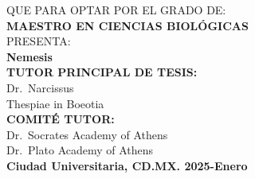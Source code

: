 \documentclass[
  10pt]{article}
\begin{document}
\begin{titlepage}
\begin{center}
        {\large QUE PARA OPTAR POR EL GRADO DE:}\\[0.15cm]
        {\Large \textbf{MAESTRO EN CIENCIAS BIOLÓGICAS}}\\[0.8cm]
        
        {\large PRESENTA:}\\[0.3cm]
        {\LARGE \textbf{Nemesis}}\\[0.8cm]
        
        {\small \textbf{TUTOR PRINCIPAL DE TESIS:}}\\
        {\small  Dr.~Narcissus }\\
        {\small  Thespiae in Boeotia }\\[0.5cm]
        
        {\small \textbf{COMITÉ TUTOR:}}\\
        {\small  Dr.~Socrates } {\small  Academy of Athens }\\
        {\small  Dr.~Plato } {\small  Academy of Athens }\\
        
        \vfill
                {\small \textbf{{Ciudad Universitaria,
CD.MX.} \hfill {2025-Enero}}}\\
                
    \end{center}
\end{titlepage}



\newpage
\begin{center}
\end{center}
\end{document}
